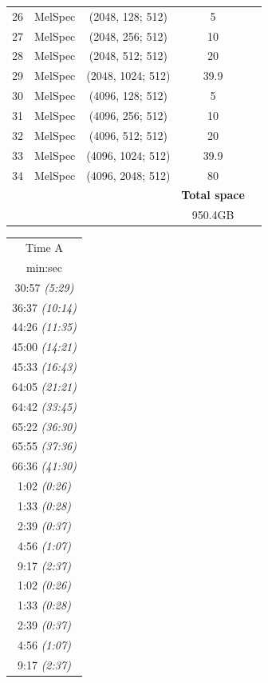 \documentclass{ieeeaccess}
\begin{document}
\begin{table}[ht]
\begin{tabular}{lcccc}
26 & MelSpec      & (2048, 128; 512)    & 5         \\ 
27 & MelSpec      & (2048, 256; 512)    & 10        \\ 
28 & MelSpec      & (2048, 512; 512)    & 20        \\ 
29 & MelSpec      & (2048, 1024; 512)   & 39.9      \\ 
30 & MelSpec      & (4096, 128; 512)    & 5         \\ 
31 & MelSpec      & (4096, 256; 512)    & 10        \\ 
32 & MelSpec      & (4096, 512; 512)    & 20        \\ 
33 & MelSpec      & (4096, 1024; 512)   & 39.9      \\ 
34 & MelSpec      & (4096, 2048; 512)   & 80        \\ \midrule
  &          &                     & \textbf{Total space} \\ 
  &          &                     & 950.4GB         \\
\bottomrule
\end{tabular}%
\begin{tabular}{c}
\toprule
Time A\\
min:sec\\ \midrule
30:57 \textit{(5:29)} \\ 36:37 \textit{(10:14)} \\ 44:26 \textit{(11:35)} \\ 45:00 \textit{(14:21)} \\ 45:33 \textit{(16:43)} \\ 64:05 \textit{(21:21)} \\ 64:42 \textit{(33:45)} \\ 65:22 \textit{(36:30)} \\ 65:55 \textit{(37:36)} \\ 66:36 \textit{(41:30)} \\ 
1:02 \textit{(0:26)} \\ 1:33 \textit{(0:28)} \\ 2:39 \textit{(0:37)} \\ 4:56 \textit{(1:07)} \\ 9:17 \textit{(2:37)} \\ 
1:02 \textit{(0:26)} \\ 1:33 \textit{(0:28)} \\ 2:39 \textit{(0:37)} \\ 4:56 \textit{(1:07)} \\ 9:17 \textit{(2:37)} \\ 

\end{tabular}
\end{table}
\end{document}
